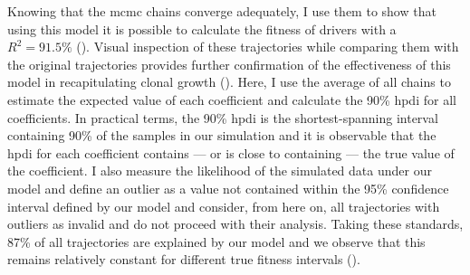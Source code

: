 \begin{figure}[h]
	\label{fig:mcmc-chains-sim}
\end{figure}

\begin{figure}[h]
	\label{fig:mcmc-ess}
\end{figure}

Knowing that the \ac{mcmc} chains converge adequately, I use them to show that using this model it is possible to calculate the fitness of drivers with a $R^2 = 91.5\%$ (). Visual inspection of these trajectories while comparing them with the original trajectories provides further confirmation of the effectiveness of this model in recapitulating clonal growth (). Here, I use the average of all chains to estimate the expected value of each coefficient and calculate the 90\% \ac{hpdi} for all coefficients. In practical terms, the 90\% \ac{hpdi} is the shortest-spanning interval containing 90\% of the samples in our simulation and it is observable that the \ac{hpdi} for each coefficient contains --- or is close to containing --- the true value of the coefficient. I also measure the likelihood of the simulated data under our model and define an outlier as a value not contained within the 95\% confidence interval defined by our model and consider, from here on, all trajectories with outliers as invalid and do not proceed with their analysis. Taking these standards, 87\% of all trajectories are explained by our model and we observe that this remains relatively constant for different true fitness intervals ().

\begin{figure}[h]
	\label{fig:sim-vs-inf-driver}
\end{figure}

\begin{figure}[h]
	\label{fig:trajectory-examples-sim}
\end{figure}

